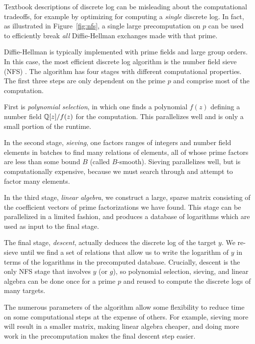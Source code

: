 Textbook descriptions of discrete log can be misleading about the
computational tradeoffs, for example by optimizing for computing a \emph{single} discrete log. In fact, as illustrated in Figure~\ref{fig:nfs}, a
single large precomputation on $p$ can be used to efficiently break \emph{all}
 Diffie-Hellman exchanges made with that prime.


Diffie-Hellman is typically implemented with prime fields and large
group orders. In this case, the most efficient discrete log algorithm
is the number field sieve (NFS) \cite{discrete-log-nfs-1993,virtual-logarithms-2005,nfs-prime-field-2003}.
The algorithm has four stages with different computational properties. The first three steps
are only dependent on the prime $p$ and comprise most of the computation.



First is \emph{polynomial selection}, in which one finds a polynomial
$f(z)$ defining a number field $\mathbb{Q}[z]/f(z)$ for the computation. This parallelizes well
and is only a small portion of the runtime.

In the second stage, \emph{sieving}, one factors ranges of integers and
number field elements in batches to find many relations of elements,
all of whose prime factors are less than some bound $B$ (called
$B$-smooth).
Sieving parallelizes well, but is computationally
expensive, because we must search through and attempt to factor many
elements.

In the third stage, \emph{linear algebra}, we construct a large, sparse
matrix consisting of the coefficient vectors of prime factorizations
we have found.  This stage can be parallelized in a
limited fashion, and produces a database of logarithms which are used as input to the final stage.

The final stage, \emph{descent}, actually deduces the discrete
log of the target $y$.  We re-sieve until we find a set
of relations that allow us to write the logarithm of $y$ in terms of the
logarithms in the precomputed database.  Crucially, descent is the only NFS stage that involves $y$ (or $g$),
so polynomial selection, sieving, and linear algebra can
be done once for a prime $p$ and reused to compute the discrete
logs of many targets.


The numerous parameters of the algorithm allow some flexibility to
reduce time on some computational steps at the expense of others. For
example, sieving more will result in a smaller matrix, making linear
algebra cheaper, and doing more work in the precomputation makes the
final descent step easier.




